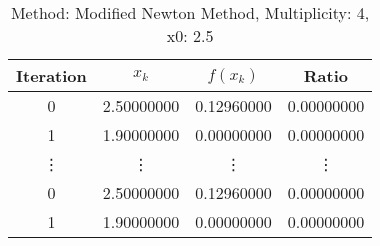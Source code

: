 \begin{table}
\centering
\caption{Method: Modified Newton Method, Multiplicity: 4, x0: 2.5}
\label{tab:table_Modified_Newton_Method_4_2_5}
\begin{tabular}{c c c c}
\toprule
Iteration &      $x_k$ &   $f(x_k)$ &      Ratio \\
\midrule
        0 & 2.50000000 & 0.12960000 & 0.00000000 \\
        1 & 1.90000000 & 0.00000000 & 0.00000000 \\
   \vdots &     \vdots &     \vdots &     \vdots \\
        0 & 2.50000000 & 0.12960000 & 0.00000000 \\
        1 & 1.90000000 & 0.00000000 & 0.00000000 \\
\bottomrule
\end{tabular}
\end{table}
